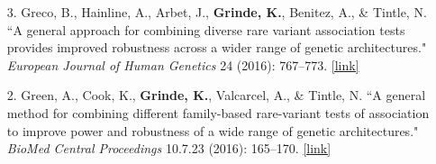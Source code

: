 \documentclass[margin]{res}
\begin{document}
\begin{resume}
\begin{itemize}
\item[3.] Greco, B., Hainline, A., Arbet, J., \textbf{Grinde, K.}, Benitez, A., \& Tintle, N. ``A general approach for combining diverse rare variant association tests provides improved robustness across a wider range of genetic architectures." \textit{European Journal of Human Genetics} 24 (2016): 767--773.
\href{https://www.nature.com/articles/ejhg2015194}{[link]}
	
\item[2.] Green, A., Cook, K., \textbf{Grinde, K.}, Valcarcel, A., \& Tintle, N. ``A general method for combining different family-based rare-variant tests of association to improve power and robustness of a wide range of genetic architectures." \textit{BioMed Central Proceedings} 10.7.23 (2016): 165--170.
\href{https://bmcproc.biomedcentral.com/articles/10.1186/s12919-016-0024-y}{[link]}
	

\end{itemize}
\end{resume}
\end{document}
